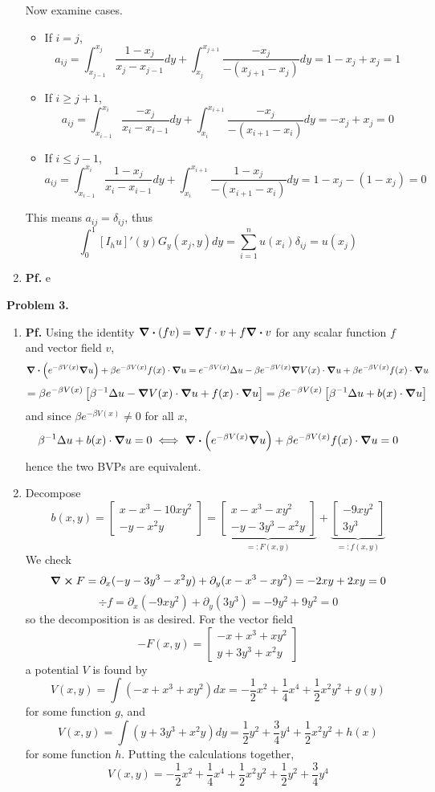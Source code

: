 \documentclass{article}
\def\tbf#1{\textbf{#1}}
\newcommand{\sbr}[1]{\left[#1\right]}
\newcommand{\m}[2][b]{\begin{#1matrix}#2\end{#1matrix}}
\newcommand{\inv}{^{-1}}
\newcommand{\pf}{\tbf{Pf. }}
\newcommand{\ptl}{\partial}
\begin{document}
\begin{enumerate}[label=(\alph*)]
Now examine cases.
\begin{itemize}
	
	\item If $i=j$,
	$$a_{ij} = \int_{x_{j-1}}^{x_j}\frac{1-x_j}{x_j-x_{j-1}}dy + \int_{x_j}^{x_{j+1}}\frac{-x_j}{-(x_{j+1}-x_j)}dy
	= 1 - x_j + x_j
	= 1$$
	
	\item If $i\ge j+1$,
	$$a_{ij} = \int_{x_{i-1}}^{x_i}\frac{-x_j}{x_i-x_{i-1}}dy + \int_{x_i}^{x_{i+1}}\frac{-x_j}{-(x_{i+1}-x_i)}dy
	= -x_j + x_j
	= 0$$
	
	\item If $i\le j-1$,
	$$a_{ij} = \int_{x_{i-1}}^{x_i}\frac{1-x_j}{x_i-x_{i-1}}dy + \int_{x_i}^{x_{i+1}}\frac{1-x_j}{-(x_{i+1}-x_i)}dy
	= 1 - x_j - (1 - x_j)
	= 0$$	
	
\end{itemize}
This means $a_{ij}=\delta_{ij}$, thus
$$\int_0^1 [I_hu]'(y)G_y(x_j,y)dy = \sum_{i=1}^n u(x_i)\delta_{ij} = u(x_j)$$


\item \pf e
	
\end{enumerate}



\tbf{Problem 3.}

\begin{enumerate}[label=(\alph*)]
	
\item \pf Using the identity $\div(fv)=\grad f\cdot v+f\div v$ for any scalar function $f$ and vector field $v$,
$$\div(e^{-\beta V(x)}\grad u) + \beta e^{-\beta V(x)}f(x)\cdot\grad u
= e^{-\beta V(x)}\Delta u - \beta e^{-\beta V(x)}\grad V(x)\cdot\grad u + \beta e^{-\beta V(x)}f(x)\cdot\grad u$$
$$= \beta e^{-\beta V(x)}\sbr{\beta\inv\Delta u - \grad V(x)\cdot\grad u + f(x)\cdot\grad u}
= \beta e^{-\beta V(x)}\sbr{\beta\inv\Delta u + b(x)\cdot\grad u}$$
and since $\beta e^{-\beta V(x)}\ne0$ for all $x$,
$$\beta\inv\Delta u + b(x)\cdot\grad u = 0
\iff \div(e^{-\beta V(x)}\grad u) + \beta e^{-\beta V(x)}f(x)\cdot\grad u = 0$$
hence the two BVPs are equivalent.


\item Decompose
$$b(x,y) = \m{x-x^3-10xy^2 \\ -y-x^2y}
= \underbrace{\m{x-x^3-xy^2 \\ -y-3y^3-x^2y}}_{=:F(x,y)} + \underbrace{\m{-9xy^2 \\ 3y^3}}_{=:f(x,y)}$$
We check
$$\curl F = \ptl_x(-y-3y^3-x^2y) + \ptl_y(x-x^3-xy^2) = -2xy + 2xy = 0$$
$$\div f = \ptl_x(-9xy^2) + \ptl_y(3y^3) = -9y^2 + 9y^2 = 0$$
so the decomposition is as desired. For the vector field
$$-F(x,y) = \m{-x+x^3+xy^2 \\ y+3y^3+x^2y}$$
a potential $V$ is found by
$$V(x,y) = \int (-x+x^3+xy^2)dx = -\frac12x^2 + \frac14x^4 + \frac12x^2y^2 + g(y)$$
for some function $g$, and
$$V(x,y) = \int (y+3y^3+x^2y)dy = \frac12y^2 + \frac34y^4 + \frac12x^2y^2 + h(x)$$
for some function $h$. Putting the calculations together,
$$V(x,y) = -\frac12x^2 + \frac14x^4 + \frac12x^2y^2 + \frac12y^2 + \frac34y^4$$

 
\end{enumerate}

	
\end{document}
